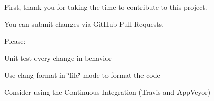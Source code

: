 First, thank you for taking the time to contribute to this project.

You can submit changes via Git\+Hub Pull Requests.

Please\+:


\begin{DoxyEnumerate}
\item Unit test every change in behavior
\item Use clang-\/format in \char`\"{}file\char`\"{} mode to format the code
\item Consider using the Continuous Integration (Travis and App\+Veyor) 
\end{DoxyEnumerate}